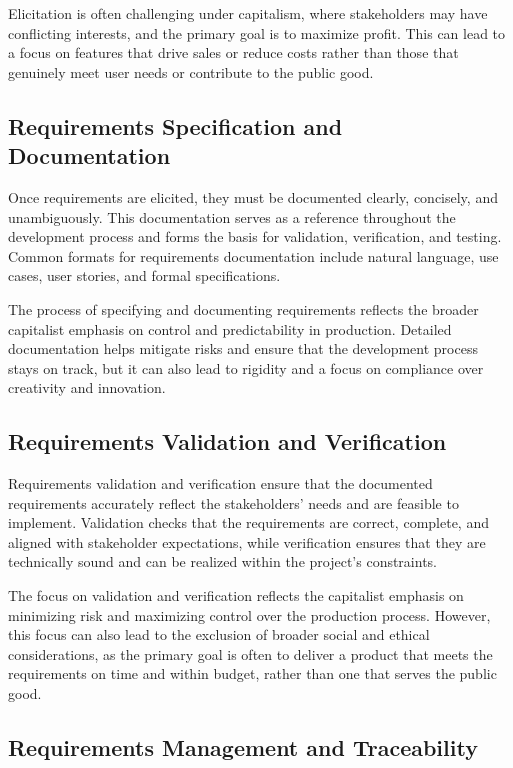 \begin{refsection}
\begin{multicols}{2}
{Elicitation is often challenging under capitalism, where stakeholders may have conflicting interests, and the primary goal is to maximize profit. This can lead to a focus on features that drive sales or reduce costs rather than those that genuinely meet user needs or contribute to the public good.

\subsection{Requirements Specification and Documentation}

Once requirements are elicited, they must be documented clearly, concisely, and unambiguously. This documentation serves as a reference throughout the development process and forms the basis for validation, verification, and testing. Common formats for requirements documentation include natural language, use cases, user stories, and formal specifications.

The process of specifying and documenting requirements reflects the broader capitalist emphasis on control and predictability in production. Detailed documentation helps mitigate risks and ensure that the development process stays on track, but it can also lead to rigidity and a focus on compliance over creativity and innovation.

\subsection{Requirements Validation and Verification}

Requirements validation and verification ensure that the documented requirements accurately reflect the stakeholders' needs and are feasible to implement. Validation checks that the requirements are correct, complete, and aligned with stakeholder expectations, while verification ensures that they are technically sound and can be realized within the project's constraints.

The focus on validation and verification reflects the capitalist emphasis on minimizing risk and maximizing control over the production process. However, this focus can also lead to the exclusion of broader social and ethical considerations, as the primary goal is often to deliver a product that meets the requirements on time and within budget, rather than one that serves the public good.

\subsection{Requirements Management and Traceability}

}
\end{multicols}
\end{refsection}
